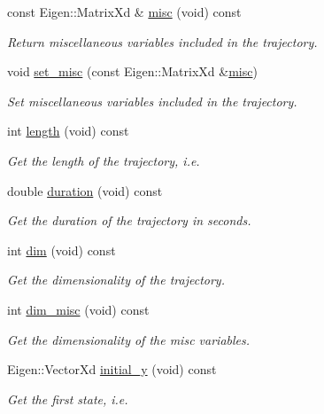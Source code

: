 \begin{DoxyCompactItemize}
const Eigen\+::\+Matrix\+Xd \& \hyperlink{classDmpBbo_1_1Trajectory_a4bd0eca2780012731ff1b64341be1cbc}{misc} (void) const 
\begin{DoxyCompactList}\small\item\em Return miscellaneous variables included in the trajectory. \end{DoxyCompactList}\item 
void \hyperlink{classDmpBbo_1_1Trajectory_a0656adfc27456c514beb22bd652f6f5d}{set\+\_\+misc} (const Eigen\+::\+Matrix\+Xd \&\hyperlink{classDmpBbo_1_1Trajectory_a4bd0eca2780012731ff1b64341be1cbc}{misc})
\begin{DoxyCompactList}\small\item\em Set miscellaneous variables included in the trajectory. \end{DoxyCompactList}\item 
int \hyperlink{classDmpBbo_1_1Trajectory_a7811beb090dc6ad38f0876f6b0fdc832}{length} (void) const 
\begin{DoxyCompactList}\small\item\em Get the length of the trajectory, i.\+e. \end{DoxyCompactList}\item 
double \hyperlink{classDmpBbo_1_1Trajectory_aa522350717a41ed129d693f0337b6247}{duration} (void) const 
\begin{DoxyCompactList}\small\item\em Get the duration of the trajectory in seconds. \end{DoxyCompactList}\item 
int \hyperlink{classDmpBbo_1_1Trajectory_a6f628f7f4ed9d77bf69f5b8560b98f18}{dim} (void) const 
\begin{DoxyCompactList}\small\item\em Get the dimensionality of the trajectory. \end{DoxyCompactList}\item 
int \hyperlink{classDmpBbo_1_1Trajectory_a54e86a99496037df2355a51d712f5d54}{dim\+\_\+misc} (void) const 
\begin{DoxyCompactList}\small\item\em Get the dimensionality of the misc variables. \end{DoxyCompactList}\item 
Eigen\+::\+Vector\+Xd \hyperlink{classDmpBbo_1_1Trajectory_ab8f4e6185b63fbd140438b09cd130eb2}{initial\+\_\+y} (void) const 
\begin{DoxyCompactList}\small\item\em Get the first state, i.\+e. \end{DoxyCompactList}\item 

\end{DoxyCompactItemize}
